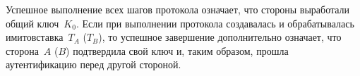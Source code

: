 Успешное выполнение всех шагов протокола означает, что 
стороны выработали общий ключ~$K_0$.
%
Если при выполнении протокола  
создавалась и обрабатывалась имитовставка~$T_A$ ($T_B$),
то успешное завершение дополнительно означает,
что сторона~$A$ ($B$) подтвердила свой ключ и, таким образом, 
прошла аутентификацию перед другой стороной.
